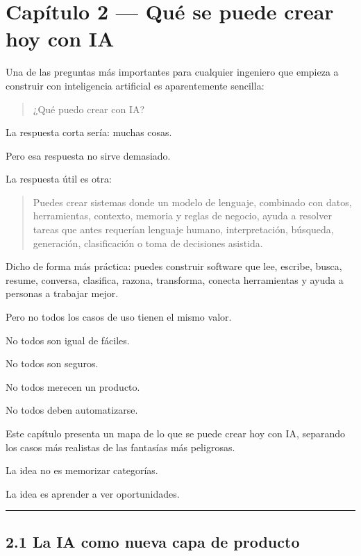 \newpage

\chapter{Capítulo 2 --- Qué se puede crear hoy con
IA}\label{capuxedtulo-2-quuxe9-se-puede-crear-hoy-con-ia}

Una de las preguntas más importantes para cualquier ingeniero que
empieza a construir con inteligencia artificial es aparentemente
sencilla:

\begin{quote}
¿Qué puedo crear con IA?
\end{quote}

La respuesta corta sería: muchas cosas.

Pero esa respuesta no sirve demasiado.

La respuesta útil es otra:

\begin{quote}
Puedes crear sistemas donde un modelo de lenguaje, combinado con datos,
herramientas, contexto, memoria y reglas de negocio, ayuda a resolver
tareas que antes requerían lenguaje humano, interpretación, búsqueda,
generación, clasificación o toma de decisiones asistida.
\end{quote}

Dicho de forma más práctica: puedes construir software que lee, escribe,
busca, resume, conversa, clasifica, razona, transforma, conecta
herramientas y ayuda a personas a trabajar mejor.

Pero no todos los casos de uso tienen el mismo valor.

No todos son igual de fáciles.

No todos son seguros.

No todos merecen un producto.

No todos deben automatizarse.

Este capítulo presenta un mapa de lo que se puede crear hoy con IA,
separando los casos más realistas de las fantasías más peligrosas.

La idea no es memorizar categorías.

La idea es aprender a ver oportunidades.

\begin{center}\rule{0.5\linewidth}{0.5pt}\end{center}

\section{2.1 La IA como nueva capa de
producto}\label{la-ia-como-nueva-capa-de-producto}

